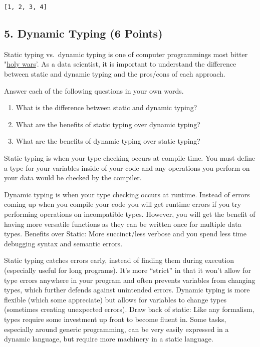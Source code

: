 \documentclass[11pt]{article}
\begin{document}
    \begin{Verbatim}[commandchars=\\\{\}]
[1, 2, 3, 4]

    \end{Verbatim}

    \hypertarget{dynamic-typing-6-points}{%
\subsection{5. Dynamic Typing (6
Points)}\label{dynamic-typing-6-points}}

Static typing vs.~dynamic typing is one of computer programmings most
bitter "\href{http://wiki.c2.com/?HolyWar}{holy wars}'. As a data
scientist, it is important to understand the difference between static
and dynamic typing and the pros/cons of each approach.

Answer each of the following questions in your own words.

\begin{enumerate}
\def\labelenumi{\alph{enumi}.}
\item
  What is the difference between static and dynamic typing?
\item
  What are the benefits of static typing over dynamic typing?
\item
  What are the benefits of dynamic typing over static typing?
\end{enumerate}

    Static typing is when your type checking occurs at compile time. You
must define a type for your variables inside of your code and any
operations you perform on your data would be checked by the compiler.

Dynamic typing is when your type checking occurs at runtime. Instead of
errors coming up when you compile your code you will get runtime errors
if you try performing operations on incompatible types. However, you
will get the benefit of having more versatile functions as they can be
written once for multiple data types. Benefits over Static: More
succinct/less verbose and you spend less time debugging syntax and
semantic errors.

Static typing catches errors early, instead of finding them during
execution (especially useful for long programs). It's more ``strict'' in
that it won't allow for type errors anywhere in your program and often
prevents variables from changing types, which further defends against
unintended errors. Dynamic typing is more flexible (which some
appreciate) but allows for variables to change types (sometimes creating
unexpected errors). Draw back of static: Like any formalism, types
require some investment up front to become fluent in. Some tasks,
especially around generic programming, can be very easily expressed in a
dynamic language, but require more machinery in a static language.
\end{document}
